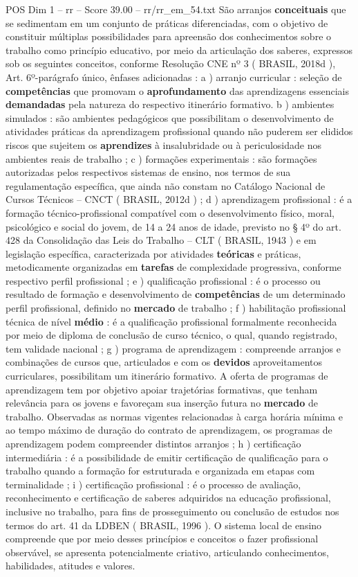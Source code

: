 \begin{textsample}{POS Dim 1 – rr – Score 39.00 – rr/rr\_em\_54.txt}
São arranjos \textbf{conceituais} que se sedimentam em um conjunto de práticas diferenciadas, com o objetivo de constituir múltiplas possibilidades para apreensão dos conhecimentos sobre o trabalho como princípio educativo, por meio da articulação dos saberes, expressos sob os seguintes conceitos, conforme Resolução CNE nº 3 ( BRASIL, 2018d ), Art. 6º-parágrafo único, ênfases adicionadas : a ) arranjo curricular : seleção de \textbf{competências} que promovam o \textbf{aprofundamento} das aprendizagens essenciais \textbf{demandadas} pela natureza do respectivo itinerário formativo. b ) ambientes simulados : são ambientes pedagógicos que possibilitam o desenvolvimento de atividades práticas da aprendizagem profissional quando não puderem ser elididos riscos que sujeitem os \textbf{aprendizes} à insalubridade ou à periculosidade nos ambientes reais de trabalho ; c ) formações experimentais : são formações autorizadas pelos respectivos sistemas de ensino, nos termos de sua regulamentação específica, que ainda não constam no Catálogo Nacional de Cursos Técnicos – CNCT ( BRASIL, 2012d ) ; d ) aprendizagem profissional : é a formação técnico-profissional compatível com o desenvolvimento físico, moral, psicológico e social do jovem, de 14 a 24 anos de idade, previsto no § 4º do art. 428 da Consolidação das Leis do Trabalho – CLT ( BRASIL, 1943 ) e em legislação específica, caracterizada por atividades \textbf{teóricas} e práticas, metodicamente organizadas em \textbf{tarefas} de complexidade progressiva, conforme respectivo perfil profissional ; e ) qualificação profissional : é o processo ou resultado de formação e desenvolvimento de \textbf{competências} de um determinado perfil profissional, definido no \textbf{mercado} de trabalho ; f ) habilitação profissional técnica de nível \textbf{médio} : é a qualificação profissional formalmente reconhecida por meio de diploma de conclusão de curso técnico, o qual, quando registrado, tem validade nacional ; g ) programa de aprendizagem : compreende arranjos e combinações de cursos que, articulados e com os \textbf{devidos} aproveitamentos curriculares, possibilitam um itinerário formativo.
A oferta de programas de aprendizagem tem por objetivo apoiar trajetórias formativas, que tenham relevância para os jovens e favoreçam sua inserção futura no \textbf{mercado} de trabalho.
Observadas as normas vigentes relacionadas à carga horária mínima e ao tempo máximo de duração do contrato de aprendizagem, os programas de aprendizagem podem compreender distintos arranjos ; h ) certificação intermediária : é a possibilidade de emitir certificação de qualificação para o trabalho quando a formação for estruturada e organizada em etapas com terminalidade ; i ) certificação profissional : é o processo de avaliação, reconhecimento e certificação de saberes adquiridos na educação profissional, inclusive no trabalho, para fins de prosseguimento ou conclusão de estudos nos termos do art. 41 da LDBEN ( BRASIL, 1996 ).
O sistema local de ensino compreende que por meio desses princípios e conceitos o fazer profissional observável, se apresenta potencialmente criativo, articulando conhecimentos, habilidades, atitudes e valores.


\end{textsample}
